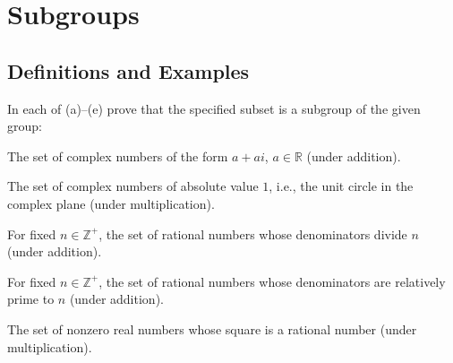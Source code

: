 \section{Subgroups}

\subsection{Definitions and Examples}

\begin{exercise}\label{ex2.1.1}
    In each of (a)--(e) prove that the specified subset is a subgroup of the given group:
    \begin{subproblems}
        \item The set of complex numbers of the form $a + ai$, $a \in \mathbb{R}$ (under addition).
        \item The set of complex numbers of absolute value $1$, i.e., the unit circle in the complex plane (under multiplication).
        \item For fixed $n \in \mathbb{Z}^+$, the set of rational numbers whose denominators divide $n$ (under addition).
        \item For fixed $n \in \mathbb{Z}^+$, the set of rational numbers whose denominators are relatively prime to $n$ (under addition).
        \item The set of nonzero real numbers whose square is a rational number (under multiplication).
    \end{subproblems}
\end{exercise}

